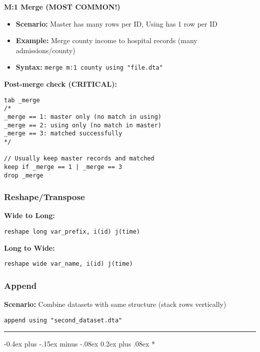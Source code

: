 ﻿\documentclass[8pt,letterpaper]{article}
\makeatletter
\renewcommand{\section}{\@startsection{section}{1}{0mm}%
                                {-0.4ex plus -.15ex minus -.08ex}%
                                {0.2ex plus .08ex}%
                                {\normalfont\fontsize{9.5pt}{9.5pt}\selectfont\bfseries\color{myblue}}}
\makeatother
\begin{document}
\begin{multicols}{2}
\textbf{M:1 Merge (MOST COMMON!)}
\begin{itemize}
\item \textbf{Scenario:} Master has many rows per ID, Using has 1 row per ID
\item \textbf{Example:} Merge county income to hospital records (many admissions/county)
\item \textbf{Syntax:} \texttt{merge m:1 county using "file.dta"}
\end{itemize}

\textbf{Post-merge check (CRITICAL):}
\begin{lstlisting}
tab _merge
/*
_merge == 1: master only (no match in using)
_merge == 2: using only (no match in master)
_merge == 3: matched successfully
*/

// Usually keep master records and matched
keep if _merge == 1 | _merge == 3
drop _merge
\end{lstlisting}

\subsubsection{Reshape/Transpose}

\textbf{Wide to Long:}
\begin{lstlisting}
reshape long var_prefix, i(id) j(time)
\end{lstlisting}

\textbf{Long to Wide:}
\begin{lstlisting}
reshape wide var_name, i(id) j(time)
\end{lstlisting}

\subsubsection{Append}

\textbf{Scenario:} Combine datasets with same structure (stack rows vertically)
\begin{lstlisting}
append using "second_dataset.dta"
\end{lstlisting}

\vspace{0.3cm}
\noindent\rule{\linewidth}{1.5pt}
\vspace{0.2cm}

\section*{\Large\colorbox{mygreen!10}{\makebox[\linewidth][c]{\textcolor{mygreen}{PART 2: STATA CODING}}}}
\vspace{0.15cm}


\end{multicols}
\end{document}
